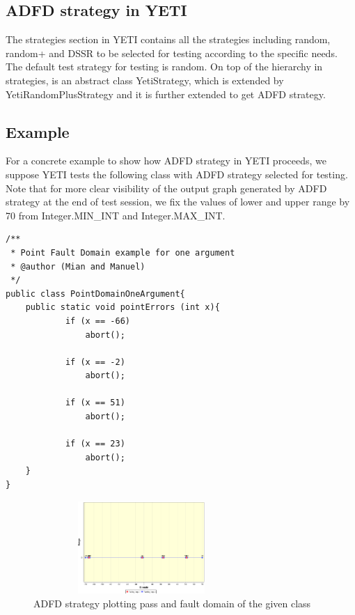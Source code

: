 \documentclass[runningheads,a4paper]{llncs}
\begin{document}
 \subsection{ADFD strategy in YETI}
The strategies section in YETI contains all the strategies including random, random+ and DSSR to be selected for testing according to the specific needs. The default test strategy for testing is random. On top of the hierarchy in strategies, is an abstract class YetiStrategy, which is extended by YetiRandomPlusStrategy and it is further extended to get ADFD strategy.
 

\subsection{Example}\label{sec:example}
For a concrete example to show how ADFD strategy in YETI proceeds, we suppose YETI tests the following class with ADFD strategy selected for testing. Note that for more clear visibility of the output graph generated by ADFD strategy at the end of test session, we fix the values of lower and upper range by 70 from Integer.MIN\_INT and Integer.MAX\_INT. 

\begin{lstlisting}
/**
 * Point Fault Domain example for one argument
 * @author (Mian and Manuel)
 */
public class PointDomainOneArgument{
	public static void pointErrors (int x){
     		if (x == -66)
       			abort();
     
     		if (x == -2)
     			abort();
      				
     		if (x == 51)
     			abort();
     
     		if (x == 23)
     			abort();
	}
}
\end{lstlisting}


\begin{figure}[H]
\centering
\includegraphics[width=8.2cm,height=3.5cm]{pointDomainOneArgument.png}
\caption{ADFD strategy plotting pass and fault domain of the given class}
\label{fig:ADFD-example}
\end{figure}
\end{document}
